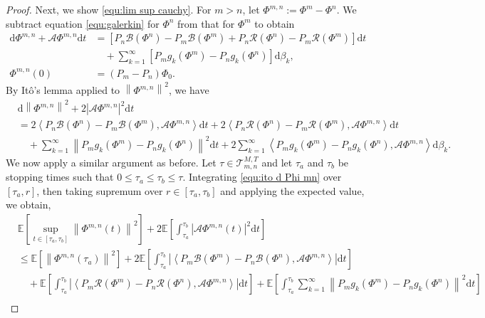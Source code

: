 \documentclass[11pt, reqno]{amsart}
\theoremstyle{definition}
\numberwithin{equation}{section}
\newcommand{\bb}{\mathbb}
\newcommand{\dt}{\mathrm{d}t}
\newcommand{\norm}[1]{\left\|{#1}\right\|}
\newcommand{\inpro}[2]{\left\langle#1,#2\right\rangle}
\newcommand{\abs}[1]{\left|{#1}\right|}
\begin{document}
\begin{proof}
Next, we show \eqref{equ:lim sup cauchy}. For $m>n$, let $\Phi^{m,n}:= \Phi^m-\Phi^n$. We subtract equation \eqref{equ:galerkin} for $\Phi^n$ from that for $\Phi^m$ to obtain
	\begin{align*}
		\mathrm{d} \Phi^{m,n} + \mathcal{A} \Phi^{m,n} \dt 
		&=
		\left[ P_n \mathcal{B}(\Phi^n)- P_m\mathcal{B}(\Phi^m) + P_n \mathcal{R}(\Phi^n) - P_m \mathcal{R}(\Phi^m) \right] \dt 
		\\
		&\quad +
		\sum_{k=1}^\infty \left[P_m g_k(\Phi^m)- P_n g_k(\Phi^n)\right] \mathrm{d}\beta_k,
		\\
		\Phi^{m,n}(0) &= (P_m-P_n)\Phi_0.
	\end{align*}
	By It\^o's lemma applied to $\norm{\Phi^{m,n}}^2$, we have 
	\begin{align}\label{equ:ito d Phi mn}
		&\mathrm{d} \norm{\Phi^{m,n}}^2
		+
		2 \abs{\mathcal{A} \Phi^{m,n}}^2 \dt 
		\nonumber\\
		&=
		2\inpro{P_n \mathcal{B}(\Phi^n)- P_m\mathcal{B}(\Phi^m)}{\mathcal{A}\Phi^{m,n}} \dt
		+ 2\inpro{ P_n \mathcal{R}(\Phi^n) - P_m \mathcal{R}(\Phi^m)}{\mathcal{A} \Phi^{m,n}} \dt
		\nonumber\\
		&\quad
		+
		\sum_{k=1}^\infty \norm{P_m g_k(\Phi^m)- P_n g_k(\Phi^n)}^2 \dt
		+
		2\sum_{k=1}^\infty \inpro{P_m g_k(\Phi^m)- P_n g_k(\Phi^n)}{\mathcal{A} \Phi^{m,n}} \mathrm{d}\beta_k.
	\end{align}
We now apply a similar argument as before. Let $\tau\in \mathcal{T}_{m,n}^{M,T}$ and let $\tau_a$ and $\tau_b$ be stopping times such that $0\leq \tau_a\leq \tau_b\leq \tau$. Integrating \eqref{equ:ito d Phi mn} over $[\tau_a,r]$, then taking supremum over $r\in [\tau_a,\tau_b]$ and applying the expected value, we obtain,
\begin{align}\label{equ:I1 to I4}
	&\bb{E} \left[ \sup_{t\in [\tau_a,\tau_b]} \norm{\Phi^{m,n}(t)}^2 \right] 
	+
	2\bb{E} \left[ \int_{\tau_a}^{\tau_b} \abs{\mathcal{A}\Phi^{m,n}(t)}^2 \dt \right]
	\nonumber\\
	&\leq
	\bb{E}\left[ \norm{\Phi^{m,n}(\tau_a)}^2 \right]
	+
	2\bb{E} \left[ \int_{\tau_a}^{\tau_b} \abs{\inpro{P_m \mathcal{B}(\Phi^m)- P_n \mathcal{B}(\Phi^n)}{\mathcal{A} \Phi^{m,n}}} \dt \right]
	\nonumber\\
	&\quad
	+
	\bb{E} \left[ \int_{\tau_a}^{\tau_b} \abs{\inpro{P_m \mathcal{R}(\Phi^m)- P_n \mathcal{R}(\Phi^n)}{\mathcal{A} \Phi^{m,n}}} \dt \right]
	+
	\bb{E} \left[ \int_{\tau_a}^{\tau_b} \sum_{k=1}^\infty \norm{P_m g_k(\Phi^m)- P_n g_k(\Phi^n)}^2 \dt \right]
	\nonumber\\

\end{align}
\end{proof}
\end{document}
